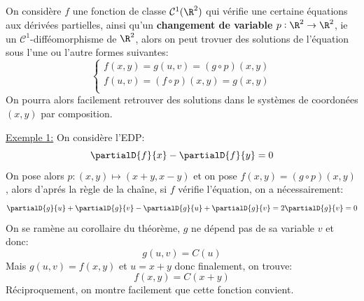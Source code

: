 \subsection*{}
On considère \(f\) une fonction de classe \(\mathcal{C}^1(\R^2)\) qui vérifie une certaine équations aux dérivées partielles, ainsi qu'un \textbf{changement de variable} \(p : \R^2 \rightarrow \R^2\), ie un \(\mathcal{C}^1\)-difféomorphisme de \(\R^2\), alors on peut trovuer des solutions de l'équation sous l'une ou l'autre formes suivantes:
\[
   \begin{cases}
      f(x, y) = g(u, v) = (g \circ p)(x, y) \\
      f(u, v) = (f \circ p)(x, y) = g(x, y)\\
   \end{cases}
\]
On pourra alors facilement retrouver des solutions dans le systèmes de coordonées \((x, y)\) par composition.\<

\uline{Exemple 1:} On considère l'EDP:
\[
   \partialD{f}{x} - \partialD{f}{y} = 0   
\]
On pose alors \(p: (x, y) \mapsto (x + y, x - y)\) et on pose \(f(x, y) = (g \circ p)(x, y)\), alors d'aprés la règle de la chaîne, si \(f\) vérifie l'équation, on a nécessairement:
\[
   \partialD{g}{u} + \partialD{g}{v} - \partialD{g}{u} + \partialD{g}{v} = 2\partialD{g}{v} = 0
\]
On se ramène au corollaire du théorème, \(g\) ne dépend pas de sa variable \(v\) et donc:
\[
   g(u, v) = C(u)   
\]
Mais \(g(u, v) = f(x, y)\) et \(u = x + y\) donc finalement, on trouve:
\[
   f(x, y) = C(x + y)    
\]
Réciproquement, on montre facilement que cette fonction convient.